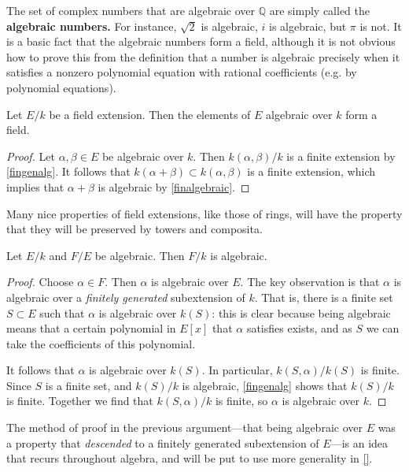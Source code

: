 The set of complex numbers that are algebraic over $\mathbb{Q}$ are simply
called the \textbf{algebraic numbers.} For instance, $\sqrt{2}$ is algebraic,
$i$ is algebraic, but $\pi$ is not.
It is a basic fact that the algebraic numbers form a field, although it is not
obvious how to prove this from the definition that a number is algebraic
precisely when it satisfies a nonzero polynomial equation with rational
coefficients (e.g. by polynomial equations).




\begin{corollary} 
Let $E/k$ be a field extension. Then the elements of $E$ algebraic over $k$
form a field.
\end{corollary} 
\begin{proof} 
Let $\alpha, \beta \in E$ be algebraic over 
$k$. Then $k(\alpha, \beta)/k$ is a finite extension by \cref{fingenalg}. It follows that $k(\alpha
+ \beta) \subset k(\alpha, \beta)$ is a finite extension, which implies that
$\alpha + \beta$ is algebraic by \cref{finalgebraic}.
\end{proof} 


Many nice properties of field extensions, like those of rings, will have the property
that they will be preserved by towers and composita.


\begin{proposition}[Towers]
Let $E/k$ and $F/E$ be algebraic. Then $F/k$ is algebraic.
\end{proposition} 
\begin{proof} 
Choose $\alpha \in F$. Then $\alpha$ is algebraic over $E$. 
The key observation is that $\alpha$ is algebraic over a \emph{finitely
generated} subextension of $k$.
That is, there is a finite set $S \subset E$ such that $\alpha $ is algebraic
over $k(S)$: this is clear because being algebraic means that a certain
polynomial in $E[x]$ that $\alpha$ satisfies exists, and as $S$ we can take the
coefficients of this polynomial.

It follows that $\alpha$ is algebraic over $k(S)$. In particular, $k(S,
\alpha)/ k(S)$ is finite. Since $S$ is a finite set, and $k(S)/k$ is algebraic,
\cref{fingenalg} shows that $k(S)/k$ is finite. Together we find that
$k(S,\alpha)/k$ is finite, so $\alpha$ is algebraic over $k$.
\end{proof} 

The method of proof in the previous argument---that being algebraic over $E$ was a
property that \emph{descended} to a finitely generated subextension of $E$---is
an idea that recurs throughout algebra, and will be put to use more generality
in \cref{}.


